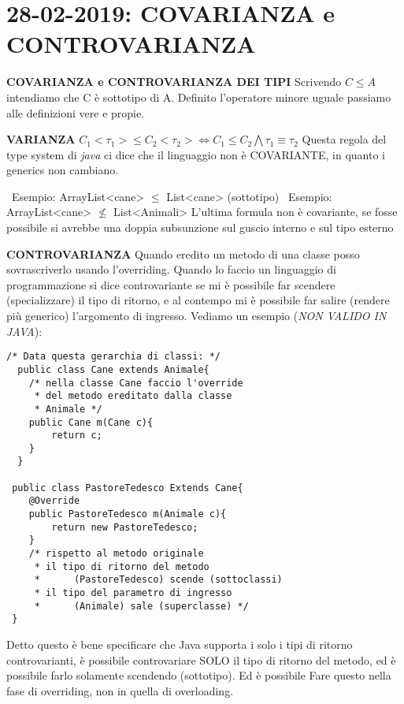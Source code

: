 

\newpage
\section{28-02-2019: COVARIANZA e CONTROVARIANZA}
\textbf{COVARIANZA e CONTROVARIANZA DEI TIPI }\newline
Scrivendo  $C \leq A$ intendiamo che C è sottotipo di A. Definito l'operatore minore uguale passiamo alle definizioni vere e propie.

\noindent \textbf{VARIANZA} \newline
$C_{1} <\tau_{1}> \leq C_{2}<\tau_{2}> \Leftrightarrow C_{1} \leq C_{2} \bigwedge \tau_{1}\equiv \tau_{2} $
\newline
Questa regola del type system di \textit{java} ci dice che il linguaggio non è COVARIANTE, in quanto i generics non cambiano. 

\noindent \textbullet\ Esempio: ArrayList<cane> $\leq$ List<cane> (sottotipo) \newline
\textbullet\ Esempio: ArrayList<cane> $\nleq$ List<Animali> \newline
L'ultima formula non è covariante, se fosse possibile si avrebbe una doppia subsunzione sul guscio interno e sul tipo esterno \newline

\noindent \textbf{CONTROVARIANZA} \newline
Quando eredito un metodo di una classe posso sovrascriverlo usando l'overriding. Quando lo faccio un linguaggio di programmazione si dice controvariante se mi è possibile far scendere (specializzare) il tipo di ritorno, e al contempo mi è possibile far salire (rendere più generico) l'argomento di ingresso. Vediamo un esempio (\textit{NON VALIDO IN JAVA}):
\begin{lstlisting}[basicstyle=\small,]
/* Data questa gerarchia di classi: */
  public class Cane extends Animale{
	/* nella classe Cane faccio l'override
 	 * del metodo ereditato dalla classe
 	 * Animale */  
	public Cane m(Cane c){
		return c;
	}
  }
  
 public class PastoreTedesco Extends Cane{
 	@Override
	public PastoreTedesco m(Animale c){
		return new PastoreTedesco;
	}
	/* rispetto al metodo originale
	 * il tipo di ritorno del metodo 
	 *		(PastoreTedesco) scende (sottoclassi)
 	 * il tipo del parametro di ingresso 
 	 * 		(Animale) sale (superclasse) */	
 }
\end{lstlisting}

\noindent Detto questo è bene specificare che Java supporta i solo i tipi di ritorno controvarianti, è possibile controvariare SOLO il tipo di ritorno del metodo, ed è possibile farlo solamente scendendo (sottotipo). Ed è possibile Fare questo nella fase di overriding, non in quella di overloading.

